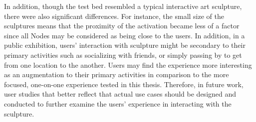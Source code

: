 In addition, though the test bed resembled a typical interactive art sculpture, there were also significant differences. For instance, the small size of the sculptures means that the proximity of the activation became less of a factor since all Nodes may be considered as being close to the users. In addition, in a public exhibition, users' interaction with sculpture might be secondary to their primary activities such as socializing with friends, or simply passing by to get from one location to the another. Users may find the experience more interesting as an augmentation to their primary activities in comparison to the more focused, one-on-one experience tested in this thesis. Therefore, in future work, user studies that better reflect that actual use cases should be designed and conducted to further examine the users' experience in interacting with the sculpture.
